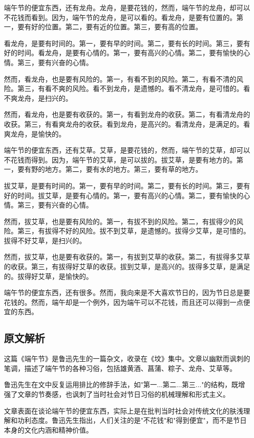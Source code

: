 \documentclass[12pt,a4paper]{article}
\begin{document}
端午节的便宜东西，还有龙舟。龙舟，是要花钱的，然而，端午节的龙舟，却可以不花钱而看到。因为，端午节的龙舟，是可以看的。看龙舟，是要有位置的。第一，要有好的位置。第二，要有近的位置。第三，要有高的位置。

看龙舟，是要有时间的。第一，要有早的时间。第二，要有长的时间。第三，要有好的时间。看龙舟，是要有心情的。第一，要有高兴的心情。第二，要有愉快的心情。第三，要有兴奋的心情。

然而，看龙舟，也是要有风险的。第一，有看不到的风险。第二，有看不清的风险。第三，有看不爽的风险。看不到龙舟，是遗憾的。看不清龙舟，是可惜的。看不爽龙舟，是扫兴的。

然而，看龙舟，也是要有收获的。第一，有看到龙舟的收获。第二，有看清龙舟的收获。第三，有看爽龙舟的收获。看到龙舟，是高兴的。看清龙舟，是满足的。看爽龙舟，是愉快的。

端午节的便宜东西，还有艾草。艾草，是要花钱的，然而，端午节的艾草，却可以不花钱而得到。因为，端午节的艾草，是可以拔的。拔艾草，是要有地方的。第一，要有野的地方。第二，要有水的地方。第三，要有草的地方。

拔艾草，是要有时间的。第一，要有早的时间。第二，要有长的时间。第三，要有好的时间。拔艾草，是要有心情的。第一，要有高兴的心情。第二，要有愉快的心情。第三，要有兴奋的心情。

然而，拔艾草，也是要有风险的。第一，有拔不到的风险。第二，有拔得少的风险。第三，有拔得不好的风险。拔不到艾草，是遗憾的。拔得少艾草，是可惜的。拔得不好艾草，是扫兴的。

然而，拔艾草，也是要有收获的。第一，有拔到艾草的收获。第二，有拔得多艾草的收获。第三，有拔得好艾草的收获。拔到艾草，是高兴的。拔得多艾草，是满足的。拔得好艾草，是愉快的。

端午节的便宜东西，还有很多。然而，我向来是不大喜欢节日的，因为节日总是要花钱的。然而，端午却是一个例外，因为端午可以不花钱，而且还可以得到一点便宜的东西。

\subsection{原文解析}

这篇《端午节》是鲁迅先生的一篇杂文，收录在《坟》集中。文章以幽默而讽刺的笔调，描述了端午节的各种习俗，包括雄黄酒、菖蒲、粽子、龙舟、艾草等。

鲁迅先生在文中反复运用排比的修辞手法，如"第一...第二...第三..."的结构，既增强了文章的节奏感，也讽刺了当时社会对节日习俗的机械理解和形式主义。

文章表面在谈论端午节的便宜东西，实际上是在批判当时社会对传统文化的肤浅理解和功利态度。鲁迅先生指出，人们关注的是"不花钱"和"得到便宜"，而不是节日本身的文化内涵和精神价值。
\end{document}
